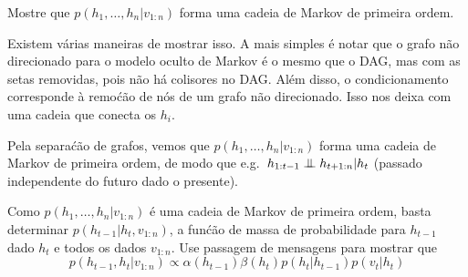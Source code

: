 \begin{exenumerate}
    \item Mostre que $p(h_1, \ldots, h_n|v_{1:n})$ forma uma
    cadeia de Markov de primeira ordem.
    
    \begin{solution}
        Existem v\'arias maneiras de mostrar isso. A mais simples \'e notar
        que o grafo n\~ao direcionado para o modelo oculto de Markov \'e o mesmo
        que o DAG, mas com as setas removidas, pois n\~ao h\'a colisores
        no DAG. Al\'em disso, o condicionamento corresponde \`a remo\'c\~ao de n\'os
        de um grafo n\~ao direcionado. Isso nos deixa com uma cadeia que
        conecta os $h_i$.
        \begin{center}
        \end{center}
        
        Pela separa\'c\~ao de grafos, vemos que $p(h_1,\ldots, h_n|v_{1:n})$ forma
        uma cadeia de Markov de primeira ordem, de modo que e.g.\ $h_{1:t-1} \mathrel{\perp\mspace{-10mu}\perp}
        h_{t+1:n} | h_t$ (passado independente do futuro dado o
        presente).
        
    \end{solution}
    
    \item Como $p(h_1, \ldots, h_n|v_{1:n})$ \'e uma cadeia de Markov de
    primeira ordem, basta determinar $p(h_{t-1}|h_t, v_{1:n})$, a
    fun\'c\~ao de massa de probabilidade para $h_{t-1}$ dado $h_t$ e
    todos os dados $v_{1:n}$. Use passagem de mensagens para mostrar
    que
    \begin{equation}
        p(h_{t-1}, h_t| v_{1:n}) \propto \alpha(h_{t-1}) \beta(h_t) p(h_t|h_{t-1})p(v_t|h_t) 
    \end{equation}
    

\end{exenumerate}
